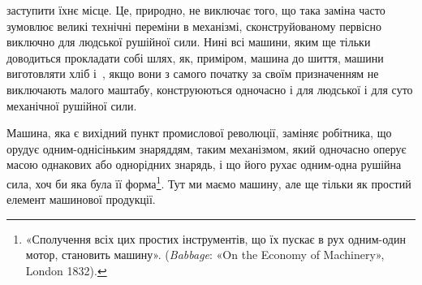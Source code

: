 \parcont{}  %
заступити їхнє місце. Це, природно, не виключає того, що така
заміна часто зумовлює великі технічні переміни в механізмі,
сконструйованому первісно виключно для людської рушійної
сили. Нині всі машини, яким ще тільки доводиться прокладати
собі шлях, як, приміром, машина до шиття, машини виготовляти
хліб і~, якщо вони з самого початку за своїм призначенням не
виключають малого маштабу, конструюються одночасно і для людської
і для суто механічної рушійної сили.

Машина, яка є вихідний пункт промислової революції, заміняє
робітника, що орудує одним-однісіньким знаряддям, таким механізмом,
який одночасно оперує масою однакових або однорідних
знарядь, і що його рухає одним-одна рушійна сила, хоч би яка
була її форма\footnote{
«Сполучення всіх цих простих інструментів, що їх пускає в рух
одним-один мотор, становить машину». (\emph{Babbage}: «On the Economy
of Machinery», London 1832).
}. Тут ми маємо машину, але ще тільки як простий
елемент машинової продукції.

